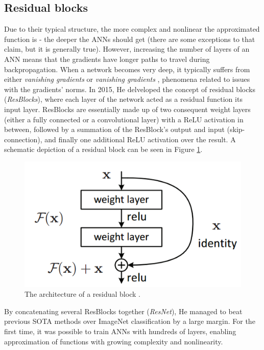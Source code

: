 \subsection{Residual blocks}
Due to their typical structure, the more complex and nonlinear the approximated function is - the deeper the ANNs should get (there are some exceptions to that claim, but it is generally true).
However, increasing the number of layers of an ANN means that the gradients have longer paths to travel during backpropagation.
When a network becomes very deep, it typically suffers from either \emph{vanishing gradients} or \emph{vanishing gradients} \cite{bengio2013advances}, phenomena related to issues with the gradients' norms.
In 2015, He \etal \cite{DBLP:journals/corr/HeZRS15} delveloped the concept of residual blocks (\emph{ResBlocks}), where each layer of the network acted as a residual function \wrt its input layer.
ResBlocks are essentially made up of two consequent weight layers (either a fully connected or a convolutional layer) with a ReLU activation in between, followed by a summation of the ResBlock's output and input (\aka skip-connection), and finally one additional ReLU activation over the result.
A schematic depiction of a residual block can be seen in Figure \ref{fig:ResBlock}.
\begin{figure}[H]
    \centering
    \includegraphics[width=0.7\linewidth]{../figs/related_work/residual_block.png}
    \caption{The architecture of a residual block \cite{He2016DeepRL}.} 
    \label{fig:ResBlock}
\end{figure}
By concatenating several ResBlocks together (\emph{ResNet}), He \etal managed to beat previous SOTA methods over ImageNet classification by a large margin. For the first time, it was possible to train ANNs with hundreds of layers, enabling approximation of functions with growing complexity and nonlinearity.

